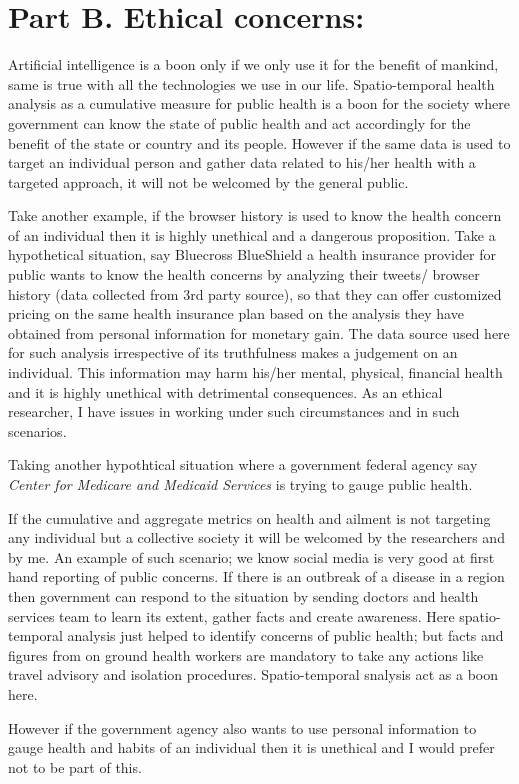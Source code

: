\section{Part B. Ethical concerns:}
\label{part_b}
Artificial intelligence is a boon only if we only use it for the benefit of mankind, same is true with all the technologies we use in our life. Spatio-temporal health analysis as a cumulative measure for public health is a boon for the society where government can know the state of public health and act accordingly for the benefit of the state or country and its people. However if the same data is used to target an individual person and gather data related to his/her health with a targeted approach, it will not be welcomed by the general public.

Take another example, if the browser history is used to know the health concern of an individual then it is highly unethical and a dangerous proposition. Take a hypothetical situation, say Bluecross BlueShield a health insurance provider for public wants to know the health concerns by analyzing their tweets/ browser history (data collected from 3rd party source), so that they can offer customized pricing on the same health insurance plan based on the analysis they have obtained from personal information for monetary gain. The data source used here for such analysis irrespective of its truthfulness makes a judgement on an individual. This information may harm his/her mental, physical, financial health and it is highly unethical with detrimental consequences. As an ethical researcher, I have issues in working under such circumstances and in such scenarios.


Taking another hypothtical situation where a government federal agency say {\em Center for Medicare and Medicaid Services} is trying to gauge public health.

 If the cumulative and aggregate metrics on health and ailment is not targeting any individual but a collective society it will be welcomed by the researchers and by me. An example of such scenario; we know social media is very good at first hand reporting of public concerns. If there is an outbreak of a disease in a region then government can respond to the situation by sending doctors and health services team to learn its extent, gather facts and create awareness. Here spatio-temporal analysis just helped to identify concerns of public health; but facts and figures from on ground health workers are mandatory to take any actions like travel advisory and isolation procedures. Spatio-temporal snalysis act as a boon here.

However if the government agency also wants to use personal information to gauge health and habits of an individual then it is unethical and I would prefer not to be part of this.


